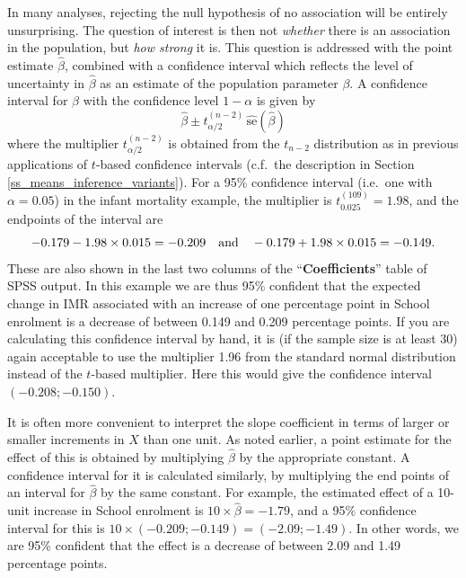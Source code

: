 In many analyses, rejecting the null hypothesis of no association will
be entirely unsurprising. The question of interest is then not
\emph{whether} there is an association in the population, but \emph{how
strong} it is. This question is addressed with the point estimate
$\hat{\beta}$, combined with a confidence interval which reflects the
level of uncertainty in $\hat{\beta}$ as an estimate of the population
parameter $\beta$. A confidence interval for $\beta$ with the
confidence level $1-\alpha$ is given by
\begin{equation}
\hat{\beta} \pm t_{\alpha/2}^{(n-2)} \, \hat{\text{se}}(\hat{\beta})
\label{cibeta}
\end{equation}
where the multiplier $t_{\alpha/2}^{(n-2)}$ is obtained from the
$t_{n-2}$ distribution as in previous applications of $t$-based
confidence intervals (c.f.\ the description in Section
\ref{ss_means_inference_variants}).
For a 95\% confidence interval (i.e.\ one with $\alpha=0.05$) in the
infant mortality example, the multiplier is $t_{0.025}^{(109)}=1.98$,
and the endpoints of the interval are
\[
-0.179-1.98\times 0.015=-0.209  \hspace*{1em}\text{and}\hspace*{1em}
-0.179+1.98\times 0.015=-0.149.
\]
These are also shown in the last two columns of the
``\textbf{Coefficients}'' table of SPSS output. In this example we are
thus 95\% confident that the expected change in IMR associated with an
increase of one percentage point in School enrolment is a decrease of
between 0.149 and 0.209 percentage points. If you are calculating this
confidence interval by hand, it is (if the sample size is at least 30)
again acceptable to use the multiplier 1.96 from the standard normal
distribution instead of the $t$-based multiplier. Here this would give
the confidence interval $(-0.208; -0.150)$.

It is often more convenient to interpret the slope coefficient in terms
of larger or smaller increments in $X$ than one unit. As noted earlier,
a point estimate for the effect of this is obtained by multiplying
$\hat{\beta}$ by the appropriate constant. A confidence interval for it
is calculated similarly, by multiplying the end points of an
interval for $\hat{\beta}$ by the same constant. For example, the
estimated effect of a 10-unit increase in School enrolment is $10\times
\hat{\beta}=-1.79$, and a 95\% confidence interval for this is $10\times
(-0.209; -0.149)=(-2.09; -1.49)$. In other words, we are 95\% confident
that the effect is a decrease of between 2.09 and 1.49 percentage
points.

